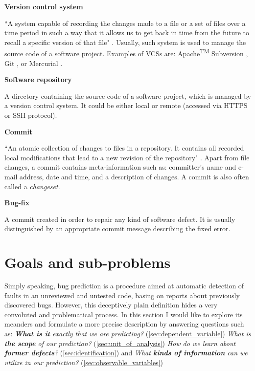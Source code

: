\documentclass{pracamgr}
\begin{document}
\bigskip \noindent
\textbf{Version control system}
\begin{adjustwidth}{\parindent}{}
``A system capable of recording the changes made to a file or a set of files over a time period in such a way that it allows us to get back in time from the future to recall a specific version of that file" \cite[p. 8]{git_book}. Usually, such system is used to manage the source code of a software project. Examples of VCSs are: Apache\textsuperscript{TM} Subversion\textsuperscript{\textregistered} \cite{subversion}, Git \cite{git}, or Mercurial \cite{mercurial}.
\end{adjustwidth}

\medskip \noindent
\textbf{Software repository}
\begin{adjustwidth}{\parindent}{}
A directory containing the source code of a software project, which is managed by a version control system. It could be either local or remote (accessed via HTTPS or SSH protocol).
\end{adjustwidth}

\medskip \noindent
\textbf{Commit}
\begin{adjustwidth}{\parindent}{}
``An atomic collection of changes to files in a repository. It contains all recorded local modifications that lead to a new revision of the repository" \cite{mercurial_wiki}. Apart from file changes, a commit contains meta-information such as: committer's name and e-mail address, date and time, and a description of changes. A commit is also often called a \textit{changeset}.
\end{adjustwidth}

\medskip \noindent
\textbf{Bug-fix}
\begin{adjustwidth}{\parindent}{}
A commit created in order to repair any kind of software defect. It is usually distinguished by an appropriate commit message describing the fixed error.
\end{adjustwidth}

\section{Goals and sub-problems}
\label{sec:goals_and_subproblems}
Simply speaking, bug prediction is a procedure aimed at automatic detection of faults in an unreviewed and untested code, basing on reports about previously discovered bugs. However, this deceptively plain definition hides a very convoluted and problematical process. In this section I would like to explore its meanders and formulate a more precise description by answering questions such as: \textit{\textbf{What is it} exactly that we are predicting?} (\ref{sec:dependent_variable}) \textit{What is \textbf{the scope} of our prediction?} (\ref{sec:unit_of_analysis}) \textit{How do we learn about \textbf{former defects}?} (\ref{sec:identification}) and \textit{What \textbf{kinds of information} can we utilize in our prediction?} (\ref{sec:observable_variables})
\end{document}
